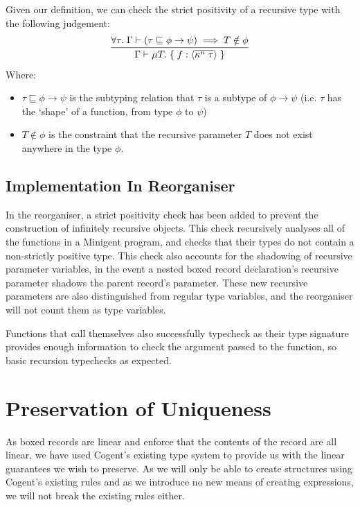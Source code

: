 Given our definition, we can check the strict positivity of a recursive type with the following judgement:
$$
\infer{
    \Gamma \vdash \mu T.\; \{\; f: \langle \overline{\kappa^n\; \tau} \rangle\; \}
}{
   \forall \tau.\; \Gamma \vdash (\tau \sqsubseteq \phi \rightarrow \psi) \implies T \notin \phi
}
$$
Where:
\begin{itemize}
    \item 
        $\tau \sqsubseteq \phi \rightarrow \psi$ is the subtyping relation that $\tau$ 
        is a subtype of $\phi \rightarrow \psi$ 
        (i.e. $\tau$ has the `shape' of a function, from type $\phi$ to $\psi$) 
    \item
        $T \notin \phi$ is the constraint that the recursive parameter $T$ 
        does not exist anywhere in the type $\phi$.
\end{itemize}


\subsection{Implementation In Reorganiser}

In the reorganiser, a strict positivity check has been added to prevent the construction of infinitely
recursive objects. This check recursively analyses all of the functions in a Minigent program, and
checks that their types do not contain a non-strictly positive type. This check also accounts for the
shadowing of recursive parameter variables, in the event a nested boxed record declaration's recursive
parameter shadows the parent record's parameter. These new recursive parameters are also distinguished from
regular type variables, and the reorganiser will not count them as type variables.

Functions that call themselves also successfully typecheck as their type signature provides enough information
to check the argument passed to the function, so basic recursion typechecks as expected.

\section{Preservation of Uniqueness}

As boxed records are linear and enforce that the contents of the record are all linear, we
have used Cogent's existing type system to provide us with the linear guarantees we wish to preserve.
As we will only be able to create structures using Cogent's existing rules and as we introduce
no new means of creating expressions, we will not break the existing rules either. 

